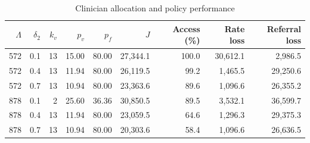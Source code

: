 \begin{table}[ht]
\centering\footnotesize
\caption{Clinician allocation and policy performance}\label{tab:staffing}
\begin{tabular}{@{}rrrrrrrrr@{}}\toprule
$\Lambda$ & $\delta_2$ & $k_v$ & $p_v$ & $p_f$ & $J$ & Access (\%) & Rate loss & Referral loss\\\midrule
572 & 0.1 & 13 & 15.00 & 80.00 & 27,344.1 & 100.0 & 30,612.1 & 2,986.5\\
572 & 0.4 & 13 & 11.94 & 80.00 & 26,119.5 & 99.2 & 1,465.5 & 29,250.6\\
572 & 0.7 & 13 & 10.94 & 80.00 & 23,363.6 & 89.6 & 1,096.6 & 26,355.2\\
878 & 0.1 & 2 & 25.60 & 36.36 & 30,850.5 & 89.5 & 3,532.1 & 36,599.7\\
878 & 0.4 & 13 & 11.94 & 80.00 & 23,059.5 & 64.6 & 1,296.3 & 29,375.3\\
878 & 0.7 & 13 & 10.94 & 80.00 & 20,303.6 & 58.4 & 1,096.6 & 26,636.5\\
\bottomrule\end{tabular}
\end{table}
